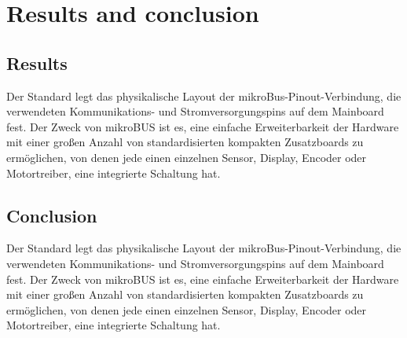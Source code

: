 \chapter{Results and conclusion}

\section{Results}
\label{sec:results}
Der Standard legt das physikalische Layout der mikroBus-Pinout-Verbindung, die verwendeten Kommunikations- und Stromversorgungspins auf dem Mainboard fest. Der Zweck von mikroBUS ist es, eine einfache Erweiterbarkeit der Hardware mit einer großen Anzahl von standardisierten kompakten Zusatzboards zu ermöglichen, von denen jede einen einzelnen Sensor, Display, Encoder oder Motortreiber, eine integrierte Schaltung hat. 

\section{Conclusion}
\label{sec:conc}
Der Standard legt das physikalische Layout der mikroBus-Pinout-Verbindung, die verwendeten Kommunikations- und Stromversorgungspins auf dem Mainboard fest. Der Zweck von mikroBUS ist es, eine einfache Erweiterbarkeit der Hardware mit einer großen Anzahl von standardisierten kompakten Zusatzboards zu ermöglichen, von denen jede einen einzelnen Sensor, Display, Encoder oder Motortreiber, eine integrierte Schaltung hat. 